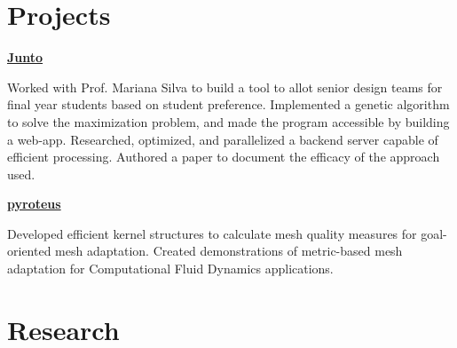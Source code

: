 \documentclass[10pt, oneside, openany]{article} %
\begin{document}
\begin{paracol}{2}
\begin{supertabular}{ll}
\end{supertabular}



\section{Projects}

{\raggedright\textbf{\href{https://peer.asee.org/34876}{Junto}}\\}

Worked with Prof. Mariana Silva to build a tool to allot senior design teams for final year students based on student preference. Implemented a genetic algorithm to solve the maximization problem, and made the program accessible by building a web-app. Researched, optimized, and parallelized a backend server capable of efficient processing. Authored a paper to document the efficacy of the approach used.\\

{\raggedright\textbf{\href{https://github.com/pyroteus/pyroteus}{{pyroteus}}\\}}
Developed efficient kernel structures to calculate mesh quality measures for goal-oriented mesh adaptation. Created demonstrations of metric-based mesh adaptation for Computational Fluid Dynamics applications.




\section{Research}






\end{paracol}
\end{document}
